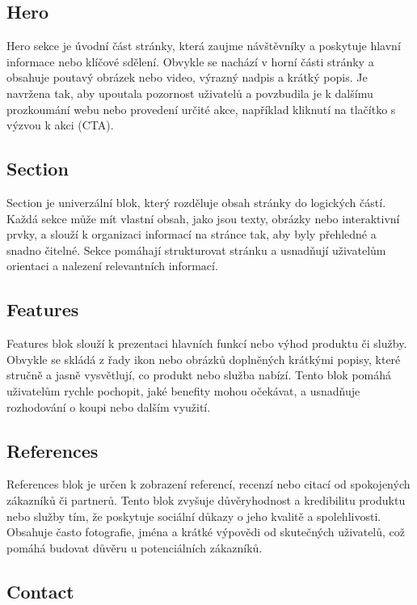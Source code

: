 \subsection{Hero}

Hero sekce je úvodní část stránky, která zaujme návštěvníky a poskytuje hlavní informace nebo klíčové sdělení. Obvykle se nachází v horní části stránky a obsahuje poutavý obrázek nebo video, výrazný nadpis a krátký popis. Je navržena tak, aby upoutala pozornost uživatelů a povzbudila je k dalšímu prozkoumání webu nebo provedení určité akce, například kliknutí na tlačítko s výzvou k akci (CTA).

\subsection{Section}

Section je univerzální blok, který rozděluje obsah stránky do logických částí. Každá sekce může mít vlastní obsah, jako jsou texty, obrázky nebo interaktivní prvky, a slouží k organizaci informací na stránce tak, aby byly přehledné a snadno čitelné. Sekce pomáhají strukturovat stránku a usnadňují uživatelům orientaci a nalezení relevantních informací.

\subsection{Features}

Features blok slouží k prezentaci hlavních funkcí nebo výhod produktu či služby. Obvykle se skládá z řady ikon nebo obrázků doplněných krátkými popisy, které stručně a jasně vysvětlují, co produkt nebo služba nabízí. Tento blok pomáhá uživatelům rychle pochopit, jaké benefity mohou očekávat, a usnadňuje rozhodování o koupi nebo dalším využití.

\subsection{References}

References blok je určen k zobrazení referencí, recenzí nebo citací od spokojených zákazníků či partnerů. Tento blok zvyšuje důvěryhodnost a kredibilitu produktu nebo služby tím, že poskytuje sociální důkazy o jeho kvalitě a spolehlivosti. Obsahuje často fotografie, jména a krátké výpovědi od skutečných uživatelů, což pomáhá budovat důvěru u potenciálních zákazníků.

\subsection{Contact}

